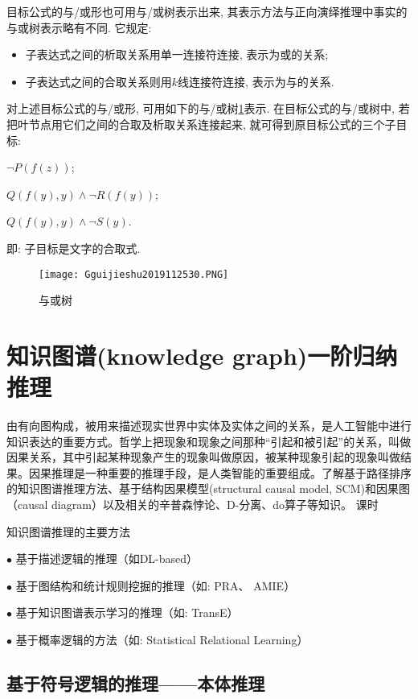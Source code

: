 目标公式的与/或形也可用与/或树表示出来, 其表示方法与正向演绎推理中事实的与或树表示略有不同. 它规定:
\begin{itemize}
\item 子表达式之间的析取关系用单一连接符连接, 表示为或的关系;
\item 子表达式之间的合取关系则用$k$线连接符连接, 表示为与的关系.
\end{itemize}
\begin{example}
对上述目标公式的与/或形, 可用如下的与/或树\ref{AI32fig2019120130}表示. 在目标公式的与/或树中, 若把叶节点用它们之间的合取及析取关系连接起来, 就可得到原目标公式的三个子目标:

$\neg P(f(z))$;

$Q(f(y), y)\wedge \neg  R(f(y))$;

 $Q(f(y), y)\wedge \neg  S(y)$.

即: 子目标是文字的合取式.
\end{example}
\begin{figure}[H]
\centering
\texttt{[image: Gguijieshu2019112530.PNG]}
\caption{与或树}
\label{AI32fig2019120130}
\end{figure}
\section{知识图谱(knowledge graph)一阶归纳推理}
由有向图构成，被用来描述现实世界中实体及实体之间的关系，是人工智能中进行知识表达的重要方式。哲学上把现象和现象之间那种“引起和被引起”的关系，叫做因果关系，其中引起某种现象产生的现象叫做原因，被某种现象引起的现象叫做结果。因果推理是一种重要的推理手段，是人类智能的重要组成。了解基于路径排序的知识图谱推理方法、基于结构因果模型(structural causal model, SCM)和因果图（causal diagram）以及相关的辛普森悖论、D-分离、do算子等知识。
课时

知识图谱推理的主要方法

$\bullet$ 基于描述逻辑的推理（如DL-based）

$\bullet$ 基于图结构和统计规则挖掘的推理（如: PRA、 AMIE）

$\bullet$ 基于知识图谱表⽰学习的推理（如: TransE）

$\bullet$ 基于概率逻辑的⽅法（如: Statistical Relational Learning）
\subsection{基于符号逻辑的推理——本体推理}

